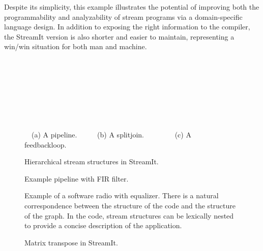 Despite its simplicity, this example illustrates the potential of
improving both the programmability and analyzability of stream
programs via a domain-specific language design.  In addition to
exposing the right information to the compiler, the StreamIt version
is also shorter and easier to maintain, representing a win/win
situation for both man and machine.

\begin{figure}[t]
\centering
\begin{minipage}{0.46in}
{\centering
{} \\
}
\end{minipage} 
\hspace{0.15in}
\begin{minipage}{1.3in}
{\centering
{} \\
}
\end{minipage}
\hspace{0.15in}
\begin{minipage}{1.02in}
{\centering
{} \\
}
\end{minipage}
\\ ~ \\ {\mbox{~}\protect\small \mbox{~}(a) A pipeline. ~~~~~(b) A splitjoin. ~~~~~~~~(c) A feedbackloop.~~~~~}
\caption{Hierarchical stream structures in StreamIt.\protect\label{fig:structures}}
\end{figure}

\begin{figure}[t]
\centering
{}
\hspace{0.15in}
\caption{Example pipeline with FIR filter.\protect\label{fig:pipeline}}
\end{figure}

\begin{figure}[t]
\centering
{}
\caption[Example of a software radio with equalizer]{Example of a
  software radio with equalizer.  There is a natural correspondence
  between the structure of the code and the structure of the graph.
  In the code, stream structures can be lexically nested to provide a
  concise description of the application.\protect\label{fig:fm-radio}}
\end{figure}

\begin{figure}[t]
\centering
{}
\caption{Matrix transpose in StreamIt.\protect\label{fig:transpose}}
\end{figure}

